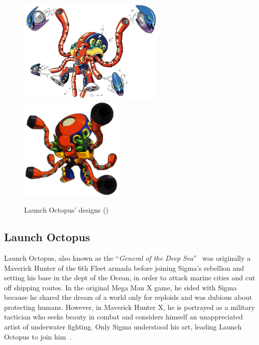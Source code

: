 \begin{figure}[htp]
	\centering
	\includegraphics[height=5cm]{figures/X1/Launch_octopus/LaunchOctopus.jpg}
	\includegraphics[height=5cm]{figures/X1/Launch_octopus/MHXLaunchOctopus.jpg}
	\caption{Launch Octopus' designs (\cite{book:MMX_Complete_art})}
\end{figure}

\subsection{Launch Octopus}\label{boss:Launch_octopus}

Launch Octopus, also known as the ``\textit{General of the Deep Sea}''~\cite{book:MMX_Complete_art} was originally a Maverick Hunter of the 6th Fleet armada before joining Sigma's rebellion and setting his base in the dept of the Ocean, in order to attack marine cities and cut off shipping routes. In the original Mega Man X game, he sided with Sigma because he shared the dream of a world only for reploids and was dubious about protecting humans. However, in Maverick Hunter X, he is portrayed as a military tactician who seeks beauty in combat and considers himself an unappreciated artist of underwater fighting. Only Sigma understood his art, leading Launch Octopus to join him~\cite{wiki:MM_MHX_script}.

